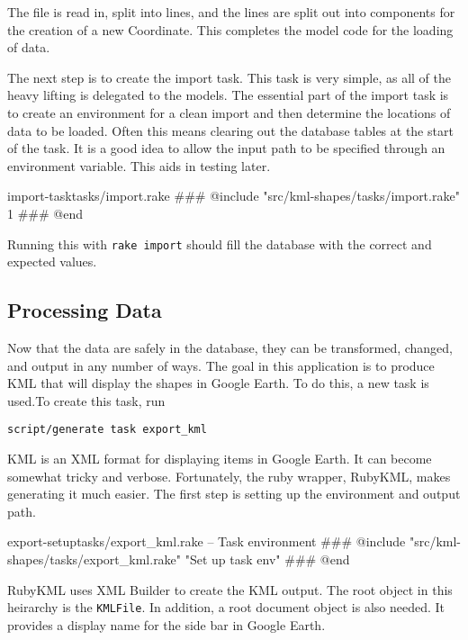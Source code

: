 \documentclass[12pt]{article}
\begin{document}
The file is read in, split into lines, and the lines are split out into components for the creation of a new Coordinate.  This completes the model code for the loading of data.

The next step is to create the import task.  This task is very simple, as all of the heavy lifting is delegated to the models.  The essential part of the import task is to create an environment for a clean import and then determine the locations of data to be loaded.  Often this means clearing out the database tables at the start of the task.  It is a good idea to allow the input path to be specified through an environment variable.  This aids in testing later.

\begin{code}{import-task}{tasks/import.rake}
### @include "src/kml-shapes/tasks/import.rake" 1
### @end
\end{code}

Running this with \texttt{rake import} should fill the database with the correct and expected values.

\subsection*{Processing Data}

Now that the data are safely in the database, they can be transformed, changed, and output in any number of ways.  The goal in this application is to produce KML that will display the shapes in Google Earth.  To do this, a new task is used.To create this task, run

\begin{Verbatim}
script/generate task export_kml
\end{Verbatim}

KML is an XML format for displaying items in Google Earth.  It can become somewhat tricky and verbose.  Fortunately, the ruby wrapper, RubyKML, makes generating it much easier.  The first step is setting up the environment and output path.

\begin{code}{export-setup}{tasks/export\_kml.rake -- Task environment}
### @include "src/kml-shapes/tasks/export_kml.rake" "Set up task env"
### @end
\end{code}

RubyKML uses XML Builder to create the KML output.  The root object in this heirarchy is the \texttt{KMLFile}.  In addition, a root document object is also needed.  It provides a display name for the side bar in Google Earth.
\end{document}
